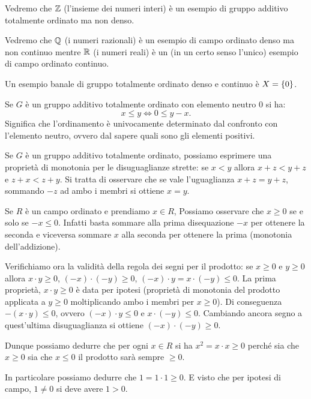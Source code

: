 \begin{example}
Vedremo che ${\mathbb Z}$ (l'insieme dei numeri interi) è un esempio di gruppo additivo totalmente ordinato 
ma non denso.
\end{example}

\begin{example}
Vedremo che ${\mathbb Q}$ (i numeri razionali) è un esempio di campo ordinato denso ma non continuo 
mentre ${\mathbb R}$ (i numeri reali) è un (in un certo senso l'unico) esempio di campo ordinato continuo.
\end{example}

\begin{example}
Un esempio banale di gruppo totalmente ordinato denso e continuo è $X={\left\{ 0 \right\}}$.
\end{example}

Se $G$ è un gruppo additivo totalmente ordinato con elemento neutro $0$ si ha:
\[
  x\le y  \iff 0 \le y-x.
\]
Significa che l'ordinamento è univocamente determinato 
dal confronto con l'elemento neutro, ovvero dal sapere 
quali sono gli elementi positivi.

Se $G$ è un gruppo additivo totalmente ordinato, possiamo esprimere una proprietà di monotonia 
per le disuguaglianze strette: se $x<y$ allora $x+z<y+z$ e $z+x<z+y$.
Si tratta di osservare che se vale l'uguaglianza $x+z=y+z$,
sommando $-z$ ad ambo i membri si ottiene $x=y$.

Se $R$ è un campo ordinato e prendiamo $x\in R$, 
Possiamo osservare che $x\ge 0$ se e solo se $-x\le 0$. 
Infatti basta sommare alla prima disequazione $-x$
per ottenere la seconda e viceversa sommare $x$ alla seconda per 
ottenere la prima (monotonia dell'addizione).

Verifichiamo ora la validità della regola dei segni per il prodotto:
se $x\ge 0$ e $y\ge 0$ allora $x\cdot y \ge 0$,
$(-x)\cdot (-y) \ge 0$, $(-x)\cdot y = x \cdot (-y) \le 0$.
La prima proprietà, $x\cdot y\ge 0$ è data per ipotesi (proprietà di monotonia 
del prodotto applicata a $y\ge 0$ moltiplicando ambo i membri per $x\ge 0$).
Di conseguenza $-(x\cdot y)\le 0$, ovvero $(-x)\cdot y \le 0$ 
e $x\cdot (-y) \le 0$. 
Cambiando ancora segno a quest'ultima disuguaglianza si ottiene $(-x)\cdot(-y)\ge 0$.

Dunque possiamo dedurre che per ogni $x\in R$ si ha $x^2=x\cdot x\ge 0$
perché sia che $x\ge 0$ sia che $x\le 0$ il prodotto sarà sempre $\ge 0$.

In particolare possiamo dedurre che $1=1\cdot 1\ge 0$. 
E visto che per ipotesi di campo, $1\neq 0$ si deve avere $1>0$.

